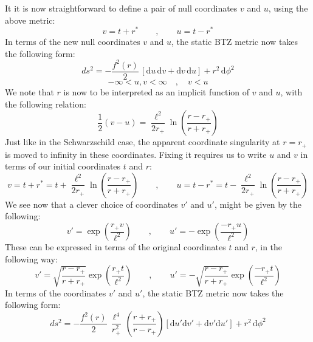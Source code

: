 %
%
%
It it is now straightforward to define a pair of null coordinates $v$ and $u$, using the above metric:
%
%
\begin{equation}
v = t + r^*
\qquad,\qquad
u = t - r^*
\end{equation}
%
%
In terms of the new null coordinates $v$ and $u$, the static BTZ metric now takes the following form:
%
%
\begin{equation}
ds^2 = - \frac{f^2(r)}{2} \, \left[ \mathrm{d}u \, \mathrm{d}v
+ \mathrm{d}v \, \mathrm{d}u \right]
+ r^2 \, \mathrm{d}\phi^2
\end{equation}
%
\begin{equation*}
-\infty < u, v < \infty 
\quad , \quad
v < u
\end{equation*}
%
%
We note that $r$ is now to be interpreted as an implicit function of $v$ and $u$, with the following relation:
%
%
\begin{equation}
\frac{1}{2}(v - u)
= \frac{\ell^2}{2 r_+} \ln \left( \frac{r - r_+}{r + r_+} \right)
\end{equation}
%
%
%
Just like in the Schwarzschild case, the apparent coordinate singularity at $r = r_+$ is moved to infinity in these coordinates. Fixing it requires us to write $u$ and $v$ in terms of our initial coordinates $t$ and $r$:
%
%
\begin{equation}
v = t + r^*
= t + \frac{\ell^2}{2 r_+} \ln \left( \frac{r - r_+}{r + r_+} \right)
\qquad , \qquad 
u = t - r^*
= t - \frac{\ell^2}{2 r_+} \ln \left( \frac{r - r_+}{r + r_+} \right)
\end{equation}
%
%
%
We see now that a clever choice of coordinates $v'$ and $u'$, might be given by the following:
%
%
\begin{equation}
v' = \exp \left( \frac{r_+ v}{\ell^2}\right) \qquad , \qquad
u' = - \exp \left( \frac{-r_+ u}{\ell^2}\right)
\end{equation}
%
%
These can be expressed in terms of the original coordinates $t$ and $r$, in the following way:
%
%
\begin{equation}
v' = \sqrt{\frac{r - r_+}{r + r_+}} \exp \left( \frac{r_+ t}{\ell^2}\right) \qquad , \qquad
u' = -\sqrt{\frac{r - r_+}{r + r_+}} \exp \left( \frac{- r_+ t}{\ell^2}\right)
\end{equation}
%
%
In terms of the coordinates $v'$ and $u'$, the static BTZ metric now takes the following form:
%
%
\begin{equation}
ds^2 = - \frac{f^2(r)}{2} \, \frac{\ell^4}{r_+^2} \,
\left( \frac{r + r_+}{r - r_+} \right) \left[ \mathrm{d}u' \mathrm{d}v' + \mathrm{d}v' \mathrm{d}u'\right]
+ r^2 \, \mathrm{d}\phi^2
\end{equation}
